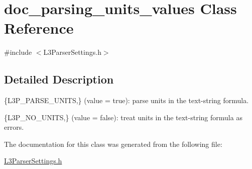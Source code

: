 \hypertarget{classdoc__parsing__units__values}{}\section{doc\+\_\+parsing\+\_\+units\+\_\+values Class Reference}
\label{classdoc__parsing__units__values}


{\ttfamily \#include $<$L3\+Parser\+Settings.\+h$>$}



\subsection{Detailed Description}

\begin{DoxyItemize}
\item \{L3\+P\+\_\+\+P\+A\+R\+S\+E\+\_\+\+U\+N\+I\+TS,\} (value = {\ttfamily true})\+: parse units in the text-\/string formula. 
\item \{L3\+P\+\_\+\+N\+O\+\_\+\+U\+N\+I\+TS,\} (value = {\ttfamily false})\+: treat units in the text-\/string formula as errors. 
\end{DoxyItemize}

The documentation for this class was generated from the following file\+:\begin{DoxyCompactItemize}
\item 
\hyperlink{_l3_parser_settings_8h}{L3\+Parser\+Settings.\+h}\end{DoxyCompactItemize}
